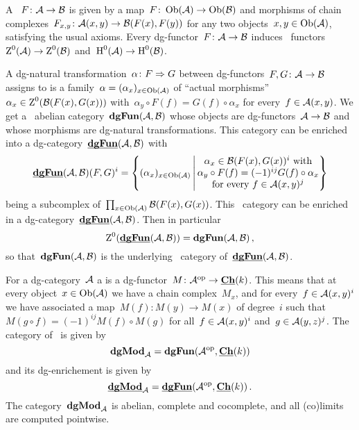 \documentclass[a4paper,10pt]{scrartcl}
\begin{document}
A ~$F \colon \mathcal{A} \to \mathcal{B}$ is given by a map~$F \colon \operatorname{Ob}(\mathcal{A}) \to \operatorname{Ob}(\mathcal{B})$ and morphisms of chain complexes~$F_{x,y} \colon \mathcal{A}(x,y) \to \mathcal{B}(F(x), F(y))$ for any two objects~$x, y \in \operatorname{Ob}(\mathcal{A})$, satisfying the usual axioms.
Every dg-functor~$F \colon \mathcal{A} \to \mathcal{B}$ induces~{\klinear} functors~$\operatorname{Z}^0(\mathcal{A}) \to \operatorname{Z}^0(\mathcal{B})$ and~$\operatorname{H}^0(\mathcal{A}) \to \operatorname{H}^0(\mathcal{B})$.

A dg-natural transformation~$\alpha \colon F \Rightarrow G$ between dg-functors~$F, G \colon \mathcal{A} \to \mathcal{B}$ assigns to is a family~$\alpha = (\alpha_x)_{x \in \operatorname{Ob}(\mathcal{A})}$ of \enquote{actual morphisms}~$\alpha_x \in \operatorname{Z}^0(\mathcal{B}(F(x), G(x)))$ with~$\alpha_y \circ F(f) = G(f) \circ \alpha_x$ for every~$f \in \mathcal{A}(x,y)$.
We get a~{\klinear} abelian category~$\mathbf{dgFun}(\mathcal{A}, \mathcal{B})$ whose objects are dg-functors~$\mathcal{A} \to \mathcal{B}$ and whose morphisms are dg-natural transformations.
This category can be enriched into a dg-category~$\underline{\smash{\mathbf{dgFun}}}(\mathcal{A}, \mathcal{B})$ with
\[
  \dgdgFun(\Acat, \Bcat)(F,G)^i
  =
  \left\{
    (\alpha_x)_{x \in \Ob(\Acat)}
  \suchthat*
    \begin{tabular}{@{}c@{}}
      $\alpha_x \in \Bcat(F(x), G(x))^i$ with \\
      $\alpha_y \circ F(f) = (-1)^{ij} G(f) \circ \alpha_x$ \\
      for every~$f \in \Acat(x,y)^j$
    \end{tabular}
  \right\}
\]
being a subcomplex of~$\prod_{x \in \operatorname{Ob}(\mathcal{A})} \mathcal{B}(F(x), G(x))$.
This~{\klinear} category can be enriched in a dg-category~$\underline{\smash{\mathbf{dgFun}}}(\mathcal{A}, \mathcal{B})$.
Then in particular
\[
  \operatorname{Z}^0(\underline{\smash{\mathbf{dgFun}}}(\mathcal{A}, \mathcal{B}))
  =
  \mathbf{dgFun}(\mathcal{A}, \mathcal{B}) \,,
\]
so that~$\mathbf{dgFun}(\mathcal{A}, \mathcal{B})$ is the underlying~{\klinear} category of~$\underline{\smash{\mathbf{dgFun}}}(\mathcal{A}, \mathcal{B})$.

For a dg-category~$\Acat$ a  is a dg-functor~$M \colon \mathcal{A}^{{\mathrm{op}}} \to \underline{\mathbf{Ch}}(k)$.
This means that at every object~$x \in \operatorname{Ob}(\mathcal{A})$ we have a chain complex~$M_x$, and for every~$f \in \mathcal{A}(x,y)^i$ we have associated a map~$M(f) \colon M(y) \to M(x)$ of degree~$i$ such that~$M(g \circ f) = (-1)^{ij} M(f) \circ M(g)$ for all~$f \in \mathcal{A}(x,y)^i$ and~$g \in \mathcal{A}(y,z)^j$.
The category of~{\dgmodules{$\Acat$}} is given by
\[
  \mathbf{dgMod}_{\mathcal{A}}
  =
  \mathbf{dgFun}(\mathcal{A}^{{\mathrm{op}}}, \underline{\mathbf{Ch}}(k))
\]
and its dg-enrichement is given by
\[
  \underline{\smash{\mathbf{dgMod}}}_{\mathcal{A}}
  =
  \underline{\smash{\mathbf{dgFun}}}(\mathcal{A}^{{\mathrm{op}}}, \underline{\mathbf{Ch}}(k)) \,.
\]
The category~$\mathbf{dgMod}_{\mathcal{A}}$ is abelian, complete and cocomplete, and all (co)limits are computed pointwise.
\end{document}
